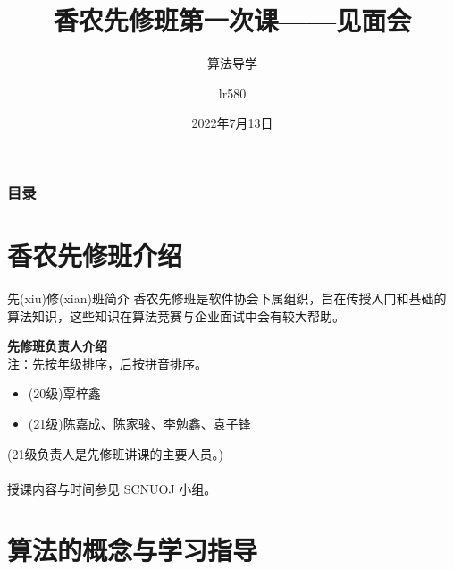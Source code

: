 \documentclass{beamer}
\begin{document}
\title{香农先修班第一次课——见面会}
\subtitle{算法导学}
\author{lr580}
\date{2022年7月13日}
\begin{frame}
    \titlepage
\end{frame}

\begin{frame}
    \frametitle{目录}
    \tableofcontents%
\end{frame}

\section{香农先修班介绍}
\begin{frame}
    \begin{block}{先(xiu)修(xian)班简介}
        香农先修班是软件协会下属组织，旨在传授入门和基础的算法知识，这些知识在算法竞赛与企业面试中会有较大帮助。
    \end{block}
    {\large\textbf{\color[RGB]{23, 130, 20}先修班负责人介绍}}\\
    {\footnotesize 注：先按年级排序，后按拼音排序。}\\
    \begin{itemize}
        \item (20级)覃梓鑫
        \item (21级)陈嘉成、陈家骏、李勉鑫、袁子锋
    \end{itemize}
    {\footnotesize (21级负责人是先修班讲课的主要人员。)}\\~\\
    授课内容与时间参见 SCNUOJ 小组。
\end{frame}

\newtheorem{chdefinition}{定义}
\section{算法的概念与学习指导}
\end{document}
